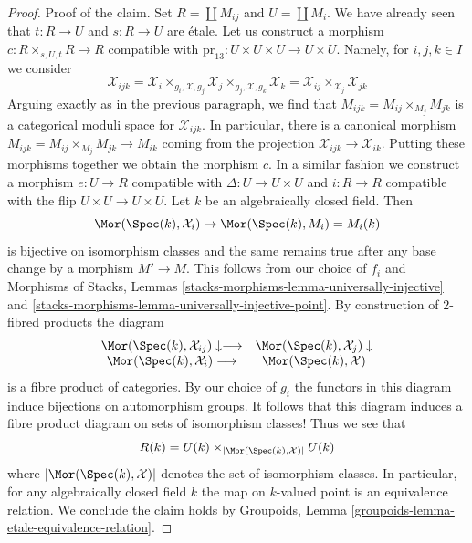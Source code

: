 \begin{proof}
\medskip\noindent
Proof of the claim. Set $R = \coprod M_{ij}$ and $U = \coprod M_i$.
We have already seen that $t : R \to U$ and $s : R \to U$ are \'etale.
Let us construct a morphism $c : R \times_{s, U, t} R \to R$
compatible with $\text{pr}_{13} : U \times U \times U \to U \times U$.
Namely, for $i, j, k \in I$ we consider
$$
\mathcal{X}_{ijk} =
\mathcal{X}_i \times_{g_i, \mathcal{X}, g_j} \mathcal{X}_j
\times_{g_j, \mathcal{X}, g_k} \mathcal{X}_k =
\mathcal{X}_{ij} \times_{\mathcal{X}_j} \mathcal{X}_{jk}
$$
Arguing exactly as in the previous paragraph,
we find that $M_{ijk} = M_{ij} \times_{M_j} M_{jk}$
is a categorical moduli space for $\mathcal{X}_{ijk}$.
In particular, there is a canonical morphism
$M_{ijk} = M_{ij} \times_{M_j} M_{jk} \to M_{ik}$
coming from the projection $\mathcal{X}_{ijk} \to \mathcal{X}_{ik}$.
Putting these morphisms together we obtain the morphism $c$.
In a similar fashion we construct a morphism $e : U \to R$
compatible with $\Delta : U \to U \times U$ and
$i : R \to R$ compatible with the flip $U \times U \to U \times U$.
Let $k$ be an algebraically closed field. Then
$$
\Mor(\Spec(k), \mathcal{X}_i) \to \Mor(\Spec(k), M_i) = M_i(k)
$$
is bijective on isomorphism classes and the same remains true after any
base change by a morphism $M' \to M$. This follows from our choice
of $f_i$ and Morphisms of Stacks, Lemmas
\ref{stacks-morphisms-lemma-universally-injective} and
\ref{stacks-morphisms-lemma-universally-injective-point}.
By construction of $2$-fibred products the diagram
$$
\begin{array}{cc}\Mor(\Spec(k), \mathcal{X}_{ij}) \downarrow\longrightarrow & \Mor(\Spec(k), \mathcal{X}_j) \downarrow \\ \Mor(\Spec(k), \mathcal{X}_i) \longrightarrow & \Mor(\Spec(k), \mathcal{X})\end{array}
$$
is a fibre product of categories. By our choice of $g_i$ the
functors in this diagram induce bijections on automorphism groups.
It follows that this diagram induces a fibre product diagram
on sets of isomorphism classes! Thus we see that
$$
R(k) = U(k) \times_{|\Mor(\Spec(k), \mathcal{X})|} U(k)
$$
where $|\Mor(\Spec(k), \mathcal{X})|$ denotes the set
of isomorphism classes.
In particular, for any algebraically closed field $k$
the map on $k$-valued point is an equivalence relation.
We conclude the claim holds by
Groupoids, Lemma \ref{groupoids-lemma-etale-equivalence-relation}.


\end{proof}
